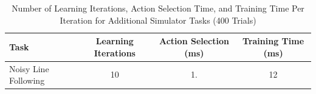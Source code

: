\documentclass[letterpaper,11pt]{article}
\begin{document}
	\begin{table}[ht]
		\centering
		\begin{tabular}{@{}lccc@{}}
			\toprule
			Task        & Learning Iterations & Action Selection (ms) & Training Time (ms) \\ \midrule
			Noisy Line Following       & 10                   & 1.                  & 12               \\
		\end{tabular}
		\caption{Number of Learning Iterations, Action Selection Time, and Training Time Per Iteration for Additional Simulator Tasks (400 Trials)}
		\label{tab:data}
	\end{table}
\end{document}
